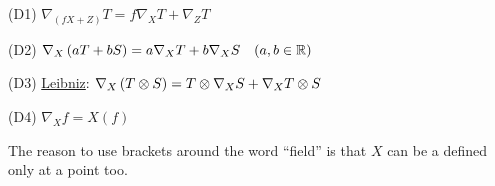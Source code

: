 (D1) $\nabla_{(fX+Z)} T = f \nabla_X T + \nabla_Z T$

(D2) $\nabla_X \left( aT + bS \right) = a \nabla_X T + b \nabla_X S \quad (a, b \in \mathbb{R})$

(D3) \underline{Leibniz}: $\nabla_X \left( T \otimes S \right) = T \otimes \nabla_X S + \nabla_X T \otimes S$

(D4) $\nabla_X f = X(f)$

The reason to use brackets around the word ``field'' is that $ X$ can be a defined only at a point too. 

